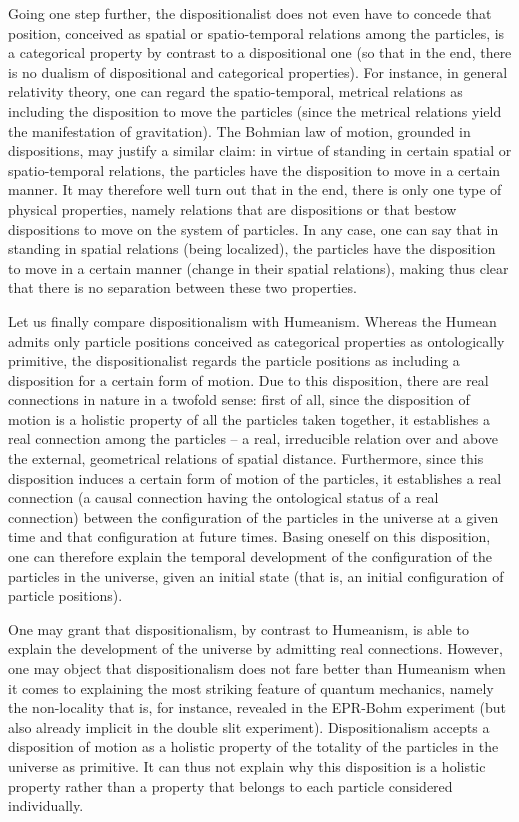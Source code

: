 \documentclass[12pt,a4paper]{article}
\theoremstyle{definition}
\begin{document}
Going one step further, the dispositionalist does not even have to concede that position, conceived as spatial or spatio-temporal relations among the particles, is a categorical property by contrast to a dispositional one (so that in the end, there is no dualism of dispositional and categorical properties). For instance, in general relativity theory, one can regard the spatio-temporal, metrical relations as including the disposition to move the particles (since the metrical relations yield the manifestation of gravitation). The Bohmian law of motion, grounded in dispositions, may justify a similar claim: in virtue of standing in certain spatial or spatio-temporal relations, the particles have the disposition to move in a certain manner. It may therefore well turn out that in the end, there is only one type of physical properties, namely relations that are dispositions or that bestow dispositions to move on the system of particles. In any case, one can say that in standing in spatial relations (being localized), the particles have the disposition to move in a certain manner (change in their spatial relations), making thus clear that there is no separation between these two properties.

Let us finally compare dispositionalism with Humeanism. Whereas the Humean admits only particle positions conceived as categorical properties as ontologically primitive, the dispositionalist regards the particle positions as including a disposition for a certain form of motion. Due to this disposition, there are real connections in nature in a twofold sense: first of all, since the disposition of motion is a holistic property of all the particles taken together, it establishes a real connection among the particles -- a real, irreducible relation over and above the external, geometrical relations of spatial distance. Furthermore, since this disposition induces a certain form of motion of the particles, it establishes a real connection (a causal connection having the ontological status of a real connection) between the configuration of the particles in the universe at a given time and that configuration at future times. Basing oneself on this disposition, one can therefore explain the temporal development of the configuration of the particles in the universe, given an initial state (that is, an initial configuration of particle positions).

One may grant that dispositionalism, by contrast to Humeanism, is able to explain the development of the universe by admitting real connections. However, one may object that dispositionalism does not fare better than Humeanism when it comes to explaining the most striking feature of quantum mechanics, namely the non-locality that is, for instance, revealed in the EPR-Bohm experiment (but also already implicit in the double slit experiment). Dispositionalism accepts a disposition of motion as a holistic property of the totality of the particles in the universe as primitive. It can thus not explain why this disposition is a holistic property rather than a property that belongs to each particle considered individually.
\end{document}
